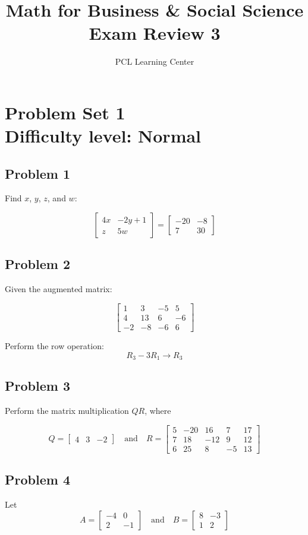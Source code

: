 \documentclass[12pt]{article}
\title{Math for Business \& Social Science\\ Exam Review 3}
\author{PCL Learning Center}
\date{}
\begin{document}
\maketitle

\section*{Problem Set 1\\Difficulty level: Normal}
\subsection*{Problem 1}
Find \( x \), \( y \), \( z \), and \( w \):

\[
\begin{bmatrix}
4x & -2y + 1 \\
z & 5w
\end{bmatrix}
=
\begin{bmatrix}
-20 & -8 \\
7 & 30
\end{bmatrix}
\]

\subsection*{Problem 2}
Given the augmented matrix:

\[
\left[
\begin{array}{ccc|c}
1 & 3 & -5 & 5 \\
4 & 13 & 6 & -6 \\
-2 & -8 & -6 & 6
\end{array}
\right]
\]

Perform the row operation: 
\[
R_3 - 3R_1 \rightarrow R_3
\]

\subsection*{Problem 3}
Perform the matrix multiplication \( QR \), where

\[
Q = 
\begin{bmatrix}
4 & 3 & -2
\end{bmatrix}
\quad \text{and} \quad
R = 
\begin{bmatrix}
5 & -20 & 16 & 7 & 17 \\
7 & 18 & -12 & 9 & 12 \\
6 & 25 & 8 & -5 & 13
\end{bmatrix}
\]

\subsection*{Problem 4}
Let
\[
A = \begin{bmatrix}
-4 & 0 \\
2 & -1
\end{bmatrix}
\quad \text{and} \quad
B = \begin{bmatrix}
8 & -3 \\
1 & 2
\end{bmatrix}
\]
\end{document}
